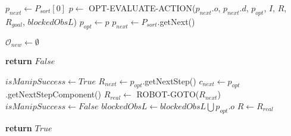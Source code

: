 \begin{algorithm}[H]
\begin{algorithmic}[1]
              \State $p_{next} \gets P_{sort}[0]$
                \State $p \gets$ OPT-EVALUATE-ACTION($p_{next}.o$, $p_{next}.d$, $p_{opt}$, $I$, $R$, $R_{goal}$, $blockedObsL$) \label{lst:line:suppcondition}
                  \State $p_{opt} \gets p$
                \EndIf
                \State $p_{next} \gets P_{sort}$.getNext()
              \EndWhile
            \EndIf \label{lst:line:01_obstacle evaluation_loop_2}


  \end{algorithmic}

\end{algorithm}

\begin{algorithm}[H]

  \label{alg:01-wu-optimized-part2}

  \begin{algorithmic}[1]


            \State $\mathcal{O}_{new} \gets \emptyset$ \label{lst:line:01_plan_execution_loop_3}

          \EndIf
           \label{lst:line:stop_condition_note}
            \State \textbf{return} $False$
          \EndIf

          \State $isManipSuccess \gets True$ \label{lst:line:plan_following_note_1}
          \State $R_{next} \gets p_{opt}$.getNextStep()
          \State $c_{next} \gets p_{opt}$.getNextStepComponent()
          \State $R_{real} \gets$ ROBOT-GOTO($R_{next}$)
            \State $isManipSuccess \gets False$
            \State $blockedObsL \gets blockedObsL \bigcup p_{opt}.o$
          \EndIf
          \State $R \gets R_{real}$ \label{lst:line:plan_following_note_2}

        \EndWhile

        \State \textbf{return} $True$ \label{lst:line:01_plan_execution_loop_4}

    \EndProcedure

  \end{algorithmic}

\end{algorithm}
